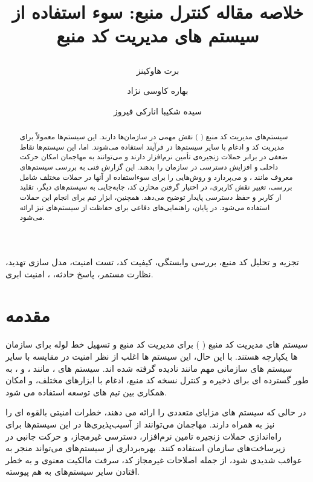 \documentclass{CSICC}
\title{
خلاصه مقاله کنترل منبع:
سوء استفاده از سیستم های مدیریت کد منبع

}
\date{}
\author[1]{برت هاوکینز}
\author[1]{بهاره کاوسی نژاد}
\author[2]{سیده شکیبا انارکی فیروز}
\affil[1]{
 دانشگاه علم و صنعت ایران، تهران
\lr{bahareh\_kavousi@comp.iust.ac.ir}
}
\affil[2]{
دانشگاه علم و صنعت ایران، تهران
\lr{shakiba\_anaraki@comp.iust.ac.ir}

}
\begin{document}
\maketitle
\begin{abstract}
	سیستم‌های مدیریت کد منبع (
	) نقش مهمی در سازمان‌ها دارند. این سیستم‌ها معمولاً برای مدیریت کد و ادغام با سایر سیستم‌ها در فرآیند
	  استفاده می‌شوند. اما، این سیستم‌ها نقاط ضعفی در برابر حملات زنجیره‌ی تأمین نرم‌افزار دارند و می‌توانند به مهاجمان امکان حرکت داخلی و افزایش دسترسی در سازمان را بدهند. این گزارش فنی به بررسی سیستم‌های
	    معروف مانند 
	    ، 
	     و 
	      می‌پردازد و روش‌هایی را برای سوءاستفاده از آنها در حملات مختلف شامل بررسی، تغییر نقش کاربری، در اختیار گرفتن مخازن کد، جابه‌جایی به سیستم‌های دیگر، تقلید از کاربر و حفظ دسترسی پایدار توضیح می‌دهد. همچنین، ابزار
	        تیم 
	         برای انجام این حملات استفاده می‌شود. در پایان، راهنمایی‌های دفاعی برای حفاظت از سیستم‌های
	           نیز ارائه می‌شود.
\end{abstract}

\begin{keywords}
تجزیه و تحلیل کد منبع،
بررسی وابستگی،
کیفیت کد،
تست امنیت،
مدل سازی تهدید،
نظارت مستمر،
پاسخ حادثه،
،
امنیت ابری.
\end{keywords}

\section{مقدمه}
سیستم های مدیریت کد منبع (
) برای مدیریت کد منبع و تسهیل خط لوله
  برای سازمان ها یکپارچه هستند. با این حال، این سیستم ها اغلب از نظر امنیت در مقایسه با سایر سیستم های سازمانی مهم مانند
    نادیده گرفته شده اند. سیستم های
     ، مانند
      ،
        و
         ، به طور گسترده ای برای ذخیره و کنترل نسخه کد منبع، ادغام با ابزارهای مختلف، و امکان همکاری بین تیم های توسعه استفاده می شود.

در حالی که سیستم های 
 مزایای متعددی را ارائه می دهند، خطرات امنیتی بالقوه ای را نیز به همراه دارند. مهاجمان می‌توانند از آسیب‌پذیری‌ها در این سیستم‌ها برای راه‌اندازی حملات زنجیره تامین نرم‌افزار، دسترسی غیرمجاز، و حرکت جانبی در زیرساخت‌های سازمان استفاده کنند. بهره‌برداری از سیستم‌های
  می‌تواند منجر به عواقب شدیدی شود، از جمله اصلاحات غیرمجاز کد، سرقت مالکیت معنوی و به خطر افتادن سایر سیستم‌های
    به هم پیوسته.
\end{document}
